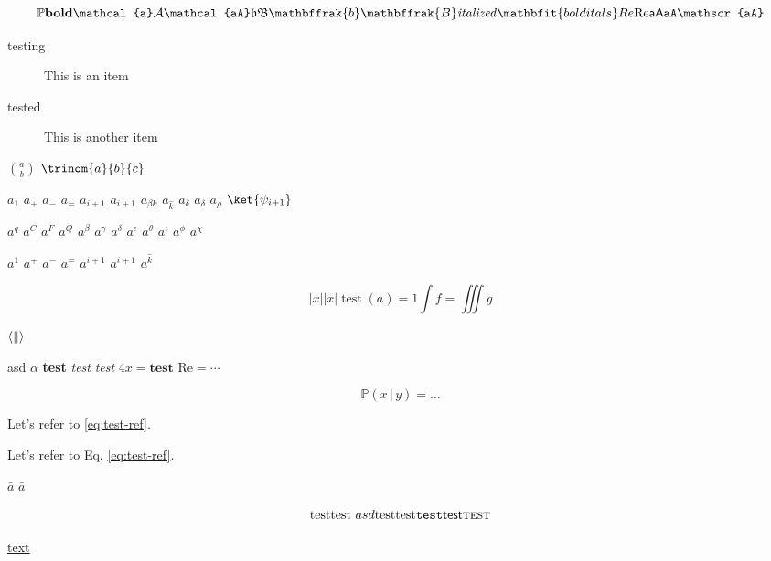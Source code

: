 \documentclass{minimal}
\begin{document}
\begin{equation}
  \mathbb{P}
  \mathbf{bold}
  \mathcal{a}
  \mathcal{A}
  \mathcal{aA}
  \mathfrak{b}
  \mathfrak{B}
  \mathbffrak{b}
  \mathbffrak{B}
  \mathit{italized}
  \mathbfit{bold itals}
  \mathnormal{Re}
  \mathrm{Re}
  \mathsf{aA}
  \mathtt{aA}
  \mathscr{aA}
\end{equation}

\begin{description}
  \item[testing] This is an item
  \item [tested] This is another item
\end{description}

$\binom{a}{b}$ $\trinom{a}{b}{c}$

$a_1$
$a_+$
$a_-$
$a_=$
$a_{i + 1}$
$a_{i+1}$
$a_{\beta k}$
$a_{\hat k}$
$a_{\delta}$
$a_\delta$
$a_\rho$
$\ket{\psi_{i+1}}$

$a^q$
$a^C$
$a^F$
$a^Q$
$a^{\beta}$
$a^{\gamma}$
$a^{\delta}$
$a^{\epsilon}$
$a^{\theta}$
$a^{\iota}$
$a^{\phi}$
$a^{\chi}$

$a^1$
$a^+$
$a^-$
$a^=$
$a^{i + 1}$
$a^{i+1}$
$a^{\hat k}$

\begin{equation}
  \lvert x \rvert
  \bigl\lvert x \bigr\rvert
  \operatorname{test}(a) = 1
  \int f = \iiint g
\end{equation}

$\langle \| \\ \rangle$

\textup{asd $\alpha$}
\textbf{test}
\textit{test}
\textsl{test}
$4 \mathit{x} = \mathbf{test}$
$\mathrm{Re} = \cdots$

\begin{equation}
  \mathbb{P}(x \,|\, y) \!= \dots
  \label{eq:test-ref}
\end{equation}

Let's refer to \eqref{eq:test-ref}.

Let's refer to Eq. \ref{eq:test-ref}.

$\bar a$
$\bar{a}$

\begin{equation}
  \text{test}
  \textnormal{test $asd$}
  \textrm{test}
  \textup{test}
  \texttt{test}
  \textsf{test}
  \textsc{test}
\end{equation}

\href{url}{text}

\end{document}
